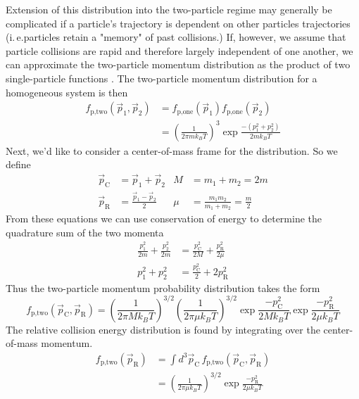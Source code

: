 Extension of this distribution into the two-particle regime may generally be complicated if a particle's trajectory is dependent on other particles trajectories (i.\,e.\;particles retain a "memory" of past collisions.) 
If, however, we assume that particle collisions are rapid and therefore largely independent of one another, we can approximate the two-particle momentum distribution as the product of two single-particle functions \cite{Chliamovitch2017,Ehrenfest2015}. 
The two-particle momentum distribution for a homogeneous system is then
\begin{equation}
\label{eq:two_particle_prob}
\begin{split}
		 f_\text{p,two}( \vec{p}_1, \vec{p}_2 ) &= f_\text{p,one}( \vec{p}_1 ) f_\text{p,one}( \vec{p}_2 ) \\
		  &= \left(\frac{1}{2 \pi m k_B T}\right)^3 \exp{\frac{-(p_1^2 + p_2^2)}{2 m k_B T}}
\end{split}
\end{equation}
Next, we'd like to consider a center-of-mass frame for the distribution. 
So we define
\begin{align*}
	\vec{p}_\text{C} & = \vec{p}_1 + \vec{p}_2             &	M   &= m_1 + m_2 = 2m \\
	\vec{p}_\text{R} & = \frac{\vec{p}_1 - \vec{p}_2}{2}   &   \mu &= \frac{m_1 m_2}{m_1 + m_2} = \frac{m}{2}
\end{align*}
From these equations we can use conservation of energy to determine the quadrature sum of the two momenta
\begin{align*}
	\frac{p_1^2}{2m} + \frac{p_2^2}{2m} &= \frac{p_\text{C}^2}{2M} + \frac{p_\text{R}^2}{2\mu} \\
	p_1^2 + p_2^2 &= \frac{p_\text{C}^2}{2} + 2 p_\text{R}^2
\end{align*}
Thus the two-particle momentum probability distribution takes the form
\begin{equation} \label{eq:two_particle_prob_inf_atomFrame}
		 f_\text{p,two}( \vec{p}_\text{C}, \vec{p}_\text{R} ) = \left(\frac{1}{2 \pi M k_B T}\right)^{3/2} \left(\frac{1}{2 \pi \mu k_B T}\right)^{3/2} 
		 \exp{\frac{-p_\text{C}^2}{2 M k_B T}} \exp{\frac{-p_\text{R}^2}{2 \mu k_B T}}
\end{equation}
The relative collision energy distribution is found by integrating over the center-of-mass momentum.
\begin{equation}
\label{eq:relEnergy_inf}
\begin{split}
	f_\text{p,two}(\vec{p}_{\text{R}}) &= \int d^3\vec{p}_\text{C} \, f_\text{p,two}(\vec{p}_\text{C},\vec{p}_\text{R}) \\
	&= \left( \frac{1}{2 \pi \mu k_B T} \right)^{3/2} \exp{\frac{-p_\text{R}^2}{2 \mu k_B T}}
\end{split}
\end{equation}


